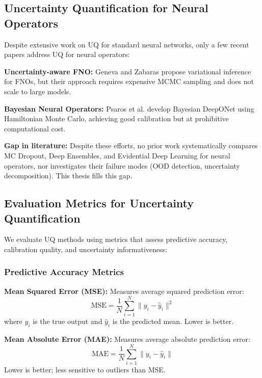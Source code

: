 \subsection{Uncertainty Quantification for Neural Operators}

Despite extensive work on UQ for standard neural networks, only a few recent papers address UQ for neural operators:

\textbf{Uncertainty-aware FNO:} Geneva and Zabaras \cite{geneva2022modeling} propose variational inference for FNOs, but their approach requires expensive MCMC sampling and does not scale to large models.

\textbf{Bayesian Neural Operators:} Psaros et al. \cite{psaros2023uncertainty} develop Bayesian DeepONet using Hamiltonian Monte Carlo, achieving good calibration but at prohibitive computational cost.

\textbf{Gap in literature:} Despite these efforts, no prior work systematically compares MC Dropout, Deep Ensembles, and Evidential Deep Learning for neural operators, nor investigates their failure modes (OOD detection, uncertainty decomposition). This thesis fills this gap.

\subsection{Evaluation Metrics for Uncertainty Quantification}

We evaluate UQ methods using metrics that assess predictive accuracy, calibration quality, and uncertainty informativeness:

\subsubsection{Predictive Accuracy Metrics}

\textbf{Mean Squared Error (MSE):} Measures average squared prediction error:
\begin{equation}
    \text{MSE} = \frac{1}{N}\sum_{i=1}^{N} \|y_i - \hat{y}_i\|^2
\end{equation}
where $y_i$ is the true output and $\hat{y}_i$ is the predicted mean. Lower is better.

\textbf{Mean Absolute Error (MAE):} Measures average absolute prediction error:
\begin{equation}
    \text{MAE} = \frac{1}{N}\sum_{i=1}^{N} \|y_i - \hat{y}_i\|
\end{equation}
Lower is better; less sensitive to outliers than MSE.

